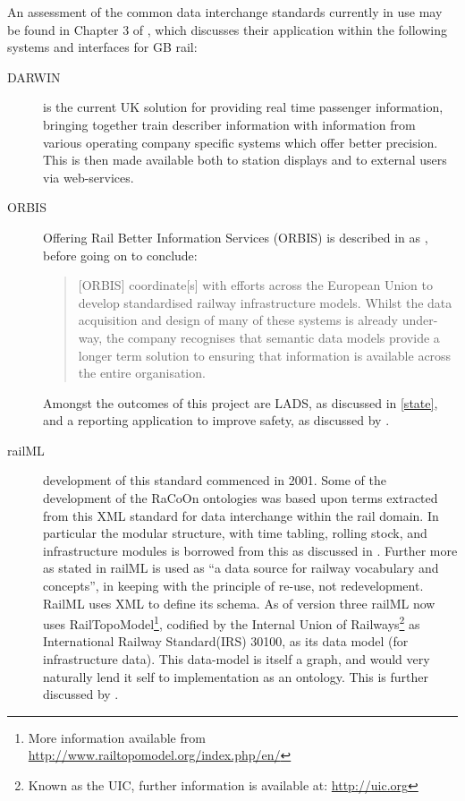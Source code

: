 An assessment of the common data interchange standards currently in use may be found in Chapter 3 of \citet{Tutcher2015}, which discusses their application within the following systems and interfaces for GB rail:
\begin{description}
    \item[DARWIN] is the current UK solution for providing real time passenger information, bringing together train describer information with information from various operating company specific systems which offer better precision. This is then made available both to station displays and to external users via web-services.
    \item[ORBIS] Offering Rail Better Information Services (ORBIS) is described in \citet{Tutcher2015}  as , before going on to conclude: 
    \begin{quote}
       [ORBIS] coordinate[s] with efforts across the European Union to develop standardised railway infrastructure models. Whilst the data acquisition and design of many of these systems is already under-way, the company recognises that semantic data models provide a longer term solution to ensuring that information is available across the entire organisation.
    \end{quote}
    Amongst the outcomes of this project are LADS, as discussed in \autoref{state}, and a  reporting application to improve safety, as discussed by \citet{Rail}.
    \item[railML] development of this standard commenced in 2001. Some of the development of the RaCoOn ontologies was based upon terms extracted from this XML standard for data interchange within the rail domain. In particular the modular structure, with time tabling, rolling stock, and infrastructure modules is borrowed from this as discussed in \citet{Tutcher2015}. Further more as stated in \citet{Tutcher2015} railML is used as ``a data source for railway vocabulary and concepts'', in keeping with the principle of re-use, not redevelopment. RailML uses XML to define its schema. As of version three railML now uses RailTopoModel\footnote{More information available from \url{http://www.railtopomodel.org/index.php/en/}}, codified by the Internal Union of Railways\footnote{Known as the UIC, further information is available at: \url{http://uic.org} } as International Railway Standard(IRS) 30100, as its data model (for infrastructure data). This data-model is itself a graph, and would very naturally lend it self to implementation as an ontology. This is further discussed by \citet{Nash2010}.

\end{description}
